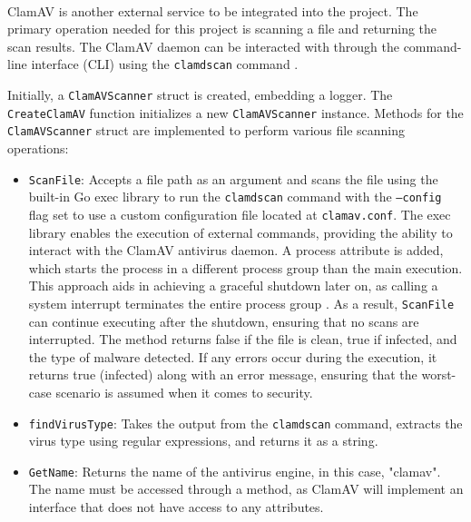 \documentclass[12pt, conference, final, a4paper, onecolumn, compsoc]{IEEEtran}
\begin{document}
\paragraph{}

ClamAV is another external service to be integrated into the project. The
primary operation needed for this project is scanning a file and returning the
scan results. The ClamAV daemon can be interacted with through the command-line
interface (CLI) using the \texttt{clamdscan} command \citep{clamav-repo}.

Initially, a \texttt{ClamAVScanner} struct is created, embedding a logger. The
\texttt{CreateClamAV} function initializes a new \texttt{ClamAVScanner}
instance. Methods for the \texttt{ClamAVScanner} struct are implemented to
perform various file scanning operations:

\begin{itemize}
  \item \texttt{ScanFile}: Accepts a file path as an argument and scans the file
        using the built-in Go exec library to run the \texttt{clamdscan} command
        with the \texttt{--config} flag set to use a custom configuration file
        located at \texttt{clamav.conf}. The exec library enables the execution
        of external commands, providing the ability to interact with the ClamAV
        antivirus daemon. A process attribute is added, which starts the process
        in a different process group than the main execution. This approach aids
        in achieving a graceful shutdown later on, as calling a system interrupt
        terminates the entire process group \citep{process-groups}. As a result,
        \texttt{ScanFile} can continue executing after the shutdown, ensuring
        that no scans are interrupted. The method returns false if the file is
        clean, true if infected, and the type of malware detected. If any errors
        occur during the execution, it returns true (infected) along with an
        error message, ensuring that the worst-case scenario is assumed when it
        comes to security.
  \item \texttt{findVirusType}: Takes the output from the \texttt{clamdscan}
        command, extracts the virus type using regular expressions, and returns
        it as a string.
  \item \texttt{GetName}: Returns the name of the antivirus engine, in this
        case, "clamav". The name must be accessed through a method, as ClamAV
        will implement an interface that does not have access to any attributes.
\end{itemize}
\end{document}
